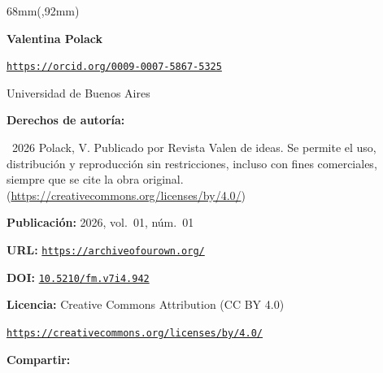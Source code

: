 \begin{textblock*}{68mm}(\gbbloquex,92mm)
{\setlength{\leftskip}{0pt}\setlength{\parindent}{0pt}%
\noindent\begin{minipage}[t]{68mm}
\sffamily\small\setlength{\parskip}{1pt}
{\bfseries\color{azulrevista}Valentina Polack}\par
{\scriptsize\texttt{\href{https://orcid.org/0009-0007-5867-5325}{https://orcid.org/0009-0007-5867-5325}}}\par
Universidad de Buenos Aires\par
\vspace{6pt}
{\bfseries\color{azulrevista!70}Derechos de autor\'ia:}\par
\textcopyright\ 2026 Polack, V. Publicado por Revista Valen de ideas. Se permite el uso, distribución y reproducción sin restricciones, incluso con fines comerciales, siempre que se cite la obra original. (\href{https://creativecommons.org/licenses/by/4.0/}{https://creativecommons.org/licenses/by/4.0/})\par\vspace{6pt}
{\bfseries\color{azulrevista!70}Publicación:} 2026, vol.~01, n\'um.~01\par\vspace{6pt}
{\bfseries\color{azulrevista!70}URL:} {\scriptsize\texttt{\href{https://archiveofourown.org/}{https://archiveofourown.org/}}}\par\vspace{6pt}
{\bfseries\color{azulrevista!70}DOI:} {\scriptsize\texttt{\href{https://doi.org/10.5210/fm.v7i4.942}{10.5210/fm.v7i4.942}}}\par\vspace{6pt}
{\bfseries\color{azulrevista!70}Licencia:} Creative Commons Attribution (CC BY 4.0)\par
{\scriptsize\texttt{\href{https://creativecommons.org/licenses/by/4.0/}{https://creativecommons.org/licenses/by/4.0/}}}\par
\vspace{6pt}
\vspace{6pt}
{\bfseries\color{azulrevista!70}Compartir:}\par\vspace{3pt}
{\large
\href{https://bsky.app/intent/compose?text=https%3A%2F%2Farchiveofourown.org%2F}{}~
\href{mailto:?subject=Las%20deudas%20pendientes%20de%20la%20digitalizaci%C3%B3n%20en%20Am%C3%A9rica%20Latina&body=https%3A%2F%2Farchiveofourown.org%2F}{}~
}
\end{minipage}}
\end{textblock*}
